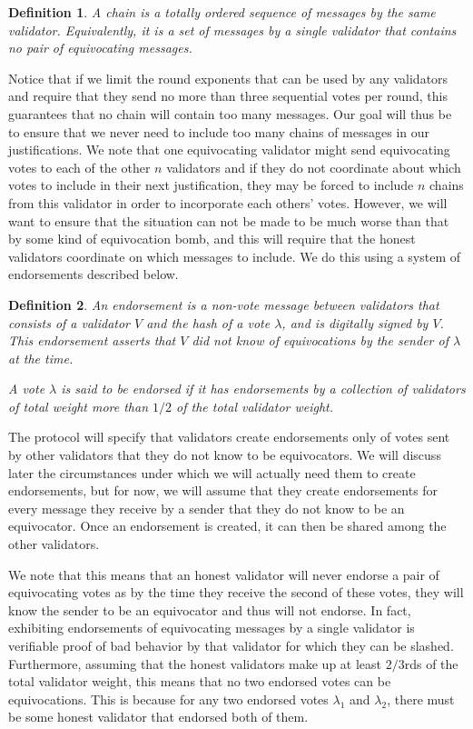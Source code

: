 \documentclass[12pt, fleqn]{article}
\newtheorem{definition}{Definition}
\begin{document}
\begin{definition}
A \emph{chain} is a totally ordered sequence of messages by the same validator. Equivalently, it is a set of messages by a single validator that contains no pair of equivocating messages.
\end{definition}

Notice that if we limit the round exponents that can be used by any validators and require that they send no more than three sequential votes per round, this guarantees that no chain will contain too many messages. Our goal will thus be to ensure that we never need to include too many chains of messages in our justifications. We note that one equivocating validator might send equivocating votes to each of the other $n$ validators and if they do not coordinate about which votes to include in their next justification, they may be forced to include $n$ chains from this validator in order to incorporate each others' votes. However, we will want to ensure that the situation can not be made to be much worse than that by some kind of equivocation bomb, and this will require that the honest validators coordinate on which messages to include. We do this using a system of endorsements described below.

\begin{definition}
An \emph{endorsement} is a non-vote message between validators that consists of a validator $V$ and the hash of a vote $\lambda$, and is digitally signed by $V$. This endorsement asserts that $V$ did not know of equivocations by the sender of $\lambda$ at the time.

A vote $\lambda$ is said to be \emph{endorsed} if it has endorsements by a collection of validators of total weight more than $1/2$ of the total validator weight.
\end{definition}

The protocol will specify that validators create endorsements only of votes sent by other validators that they do not know to be equivocators. We will discuss later the circumstances under which we will actually need them to create endorsements, but for now, we will assume that they create endorsements for every message they receive by a sender that they do not know to be an equivocator. Once an endorsement is created, it can then be shared among the other validators.

We note that this means that an honest validator will never endorse a pair of equivocating votes as by the time they receive the second of these votes, they will know the sender to be an equivocator and thus will not endorse. In fact, exhibiting endorsements of equivocating messages by a single validator is verifiable proof of bad behavior by that validator for which they can be slashed. Furthermore, assuming that the honest validators make up at least $2/3$rds of the total validator weight, this means that no two endorsed votes can be equivocations. This is because for any two endorsed votes $\lambda_1$ and $\lambda_2$, there must be some honest validator that endorsed both of them.
\end{document}
